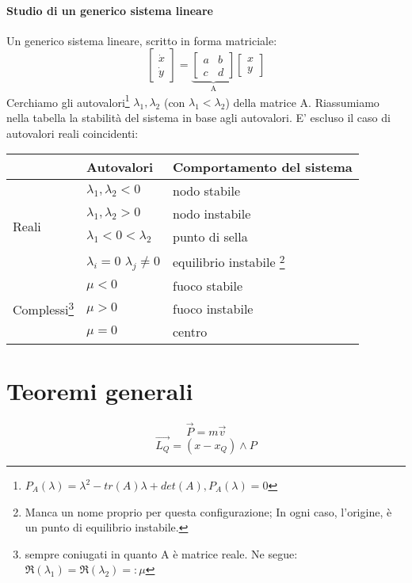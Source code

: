 \documentclass[a4paper,12pt]{article}
\begin{document}
\paragraph{Studio di un generico sistema lineare}
Un generico sistema lineare, scritto in forma matriciale:
$$\begin{bmatrix}\dot{x} \\ \dot{y} \end{bmatrix} 
=  \underbrace{\begin{bmatrix} a & b \\ c & d \end{bmatrix}}_\text{A}  \begin{bmatrix}x \\ y \end{bmatrix}
$$
Cerchiamo gli autovalori\footnote{$P_A(\lambda) = \lambda^2-tr(A)\lambda+det(A) , P_A(\lambda)=0 $} $\lambda_1,\lambda_2$ (con $\lambda_1<\lambda_2$) della matrice A. Riassumiamo nella tabella la stabilità del sistema in base agli autovalori. E' escluso il caso di autovalori reali coincidenti:
\begin{center}
\begin{savenotes}
\begin{tabular}{l|l|l}
  & Autovalori & Comportamento del sistema \\
\hline
\multirow{4}{*}{Reali} & $\lambda_1,\lambda_2 <0  $ & nodo stabile\\
& $\lambda_1,\lambda_2 >0  $ & nodo instabile\\
& $\lambda_1< 0 <\lambda_2$  & punto di sella\\
& $\lambda_i=0$ $\lambda_j \neq 0$  & equilibrio instabile \footnote{Manca un nome proprio per questa configurazione; In ogni caso, l'origine, è un punto di equilibrio instabile.}\\
\hline
\multirow{3}{*}{Complessi\footnote{sempre coniugati in quanto A è matrice reale. Ne segue: $\Re(\lambda_1)=\Re(\lambda_2) =: \mu$ }} & $\mu < 0  $ & fuoco stabile\\
& $\mu > 0  $ & fuoco instabile\\
& $\mu = 0  $ & centro\\
\end{tabular}
\end{savenotes}
\end{center}

\section{Teoremi generali}
\paragraph{}
$$
\vec{P} = m\vec{v}$$
$$
\vec{L_Q} = (x-x_Q)\wedge P
$$
\end{document}
